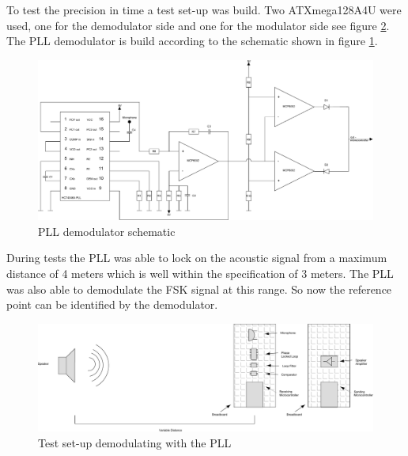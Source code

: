 \documentclass[10pt,a4paper]{article}
\begin{document}
To test the precision in time a test set-up was build. Two ATXmega128A4U were used, one for the demodulator side and one for the modulator side see figure \ref{fig:testup}. The PLL demodulator is build according to the schematic shown in figure \ref{fig:pllschematic}.

 \begin{figure}[H]
   \centering
   \includegraphics[width=\textwidth]{pllschema.pdf}
   \caption{PLL demodulator schematic}
   \label{fig:pllschematic}
\end{figure}

During tests the PLL was able to lock on the acoustic signal from a maximum distance of 4 meters which is well within the specification of 3 meters.  The PLL was also able to demodulate the FSK signal at this range. So now the reference point can be identified by the demodulator.

\begin{figure}[H]
   \centering
   \includegraphics[width=\textwidth]{testopstellingpll.pdf}
   \caption{Test set-up demodulating with the PLL}
   \label{fig:testup}
\end{figure}
\end{document}
